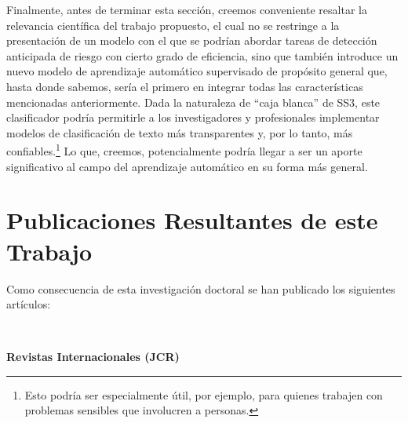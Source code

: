 Finalmente, antes de terminar esta sección, creemos conveniente resaltar la relevancia científica del trabajo propuesto, el cual no se restringe a la presentación de un modelo con el que se podrían abordar tareas de detección anticipada de riesgo con cierto grado de eficiencia, sino que también introduce un nuevo modelo de aprendizaje automático supervisado de propósito general que, hasta donde sabemos, sería el primero en integrar todas las características mencionadas anteriormente.
Dada la naturaleza de ``caja blanca'' de SS3, este clasificador podría permitirle a los investigadores y profesionales implementar modelos de clasificación de texto más transparentes y, por lo tanto, más confiables.\footnote{Esto podría ser especialmente útil, por ejemplo, para quienes trabajen con problemas sensibles que involucren a personas.} Lo que, creemos, potencialmente podría llegar a ser un aporte significativo al campo del aprendizaje automático en su forma más general.

\section{Publicaciones Resultantes de este Trabajo}

Como consecuencia de esta investigación doctoral se han publicado los siguientes artículos:

\

\noindent
\textbf{Revistas Internacionales (JCR)}

